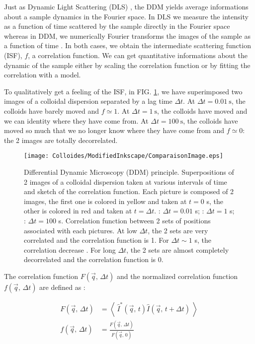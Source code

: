 \documentclass[%
 aip,
 jmp,%
 amsmath,amssymb,
reprint,%
]{revtex4-1}
\newcommand*\circled[1]{\raisebox{0.5pt}{\textcircled{\raisebox{-.9pt} {#1}}}}
\begin{document}
Just as Dynamic Light Scattering (DLS) \citep{18_sartor2003dynamic}, the DDM yields average informations about a sample dynamics in the Fourier space. In DLS we measure the intensity as a function of time scattered by the sample directly in the Fourier space whereas in  DDM, we numerically Fourier transforms the images of the sample as a function of time \citep{2_DDM}. In both cases, we obtain the intermediate scattering function (ISF), $f$, a correlation function. We can get quantitative informations about the dynamic of the sample either by scaling the correlation function or by fitting the correlation with a model.

To qualitatively get a feeling of the ISF, in FIG. \ref{SketchCorrelation}, we have superimposed two images of a colloidal dispersion separated by a lag time $\Delta t$. At $\Delta t = \SI{0.01}{\second}$, the colloids have barely moved and $f \simeq 1$. At $\Delta t = \SI{1}{\second}$, the colloids have moved and we can identity where they have come from.  At $\Delta t = \SI{100}{\second}$, the colloids have moved so much that we no longer know where they have come from and $f \simeq 0$: the 2 images are totally decorrelated.


\begin{figure}
\texttt{[image: Colloides/ModifiedInkscape/ComparaisonImage.eps]}
\caption{Differential Dynamic Microscopy (DDM) principle. Superpositions of 2 images of a colloidal dispersion taken at various intervals of time and sketch of the correlation function. Each picture is composed of 2 images, the first one is colored in yellow and taken at $t = 0$ s, the other is colored in red and taken at $t = \Delta t$. \protect\circled{1}: $\Delta t = 0.01$ s; \protect\circled{2}: $\Delta t = 1$ s; \protect\circled{3}: $\Delta t = 100$ s. Correlation function between 2 sets of positions associated with each pictures. At low $\Delta t$, the 2 sets are very correlated \protect\circled{1} and the correlation function is 1. For $\Delta t \sim 1$ s, the correlation decrease \protect\circled{2}. For long $\Delta t$, the 2 sets are almost completely decorrelated \protect\circled{3} and the correlation function is 0.}
\label{SketchCorrelation}
\end{figure}

The correlation function $F(\vec{q}, \, \Delta t)$ and the normalized correlation function $f(\vec{q}, \, \Delta t)$ are defined as \citep{19_goodman2005introduction} :

\begin{align}
F(\vec{q}, \, \Delta t) &= \left\langle \ \hat{I}^*(\vec{q},\, t) \hat{I}(\vec{q},\, t+\Delta t) \ \right\rangle \\
f(\vec{q}, \, \Delta t) &= \frac{F(\vec{q}, \, \Delta t)}{F(\vec{q}, \, 0)}
\end{align}
\end{document}
